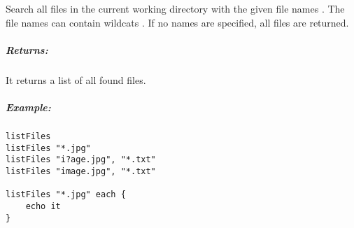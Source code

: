 \label{par:listfiles}

Search all files in the current working directory with the given file
names . The file names can contain wildcats .
If no names are specified, all files are returned.

\subparagraph{Returns:}

It returns a list of all found files.

\subparagraph{Example:}

\begin{lstlisting}[style=Groovybash, label={lst:example_listfiles}]
listFiles
listFiles "*.jpg"
listFiles "i?age.jpg", "*.txt"
listFiles "image.jpg", "*.txt"

listFiles "*.jpg" each {
    echo it
}
\end{lstlisting}

